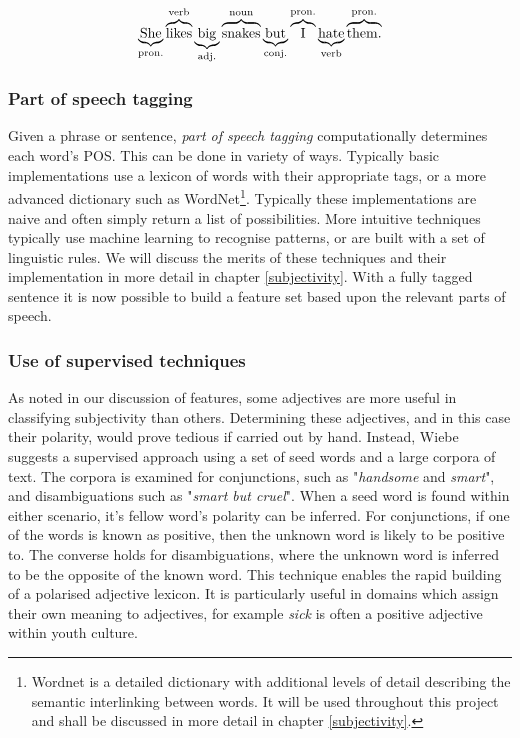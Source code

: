 \begin{equation}
	\underbrace{{\rm She}}_{\rm pron.} \overbrace{{\rm likes}}^{\rm verb} \underbrace{{\rm big}}_{\rm adj.} \overbrace{{\rm snakes}}^{\rm noun} \underbrace{{\rm but}}_{\rm conj.} \overbrace{{\rm I}}^{\rm pron.} \underbrace{{\rm hate}}_{\rm verb} \overbrace{{\rm them.}}^{\rm pron.}
\end{equation}

\subsubsection{Part of speech tagging}

Given a phrase or sentence, \emph{part of speech tagging} computationally determines each word's POS. This can be done in variety of ways. Typically basic implementations use a lexicon of words with their appropriate tags, or a more advanced dictionary such as WordNet\footnote{Wordnet is a detailed dictionary with additional levels of detail describing the semantic interlinking between words. It will be used throughout this project and shall be discussed in more detail in chapter \ref{subjectivity}.}. Typically these implementations are naive and often simply return a list of possibilities. More intuitive techniques typically use machine learning to recognise patterns, or are built with a set of linguistic rules. We will discuss the merits of these techniques and their implementation in more detail in chapter \ref{subjectivity}. With a fully tagged sentence it is now possible to build a feature set based upon the relevant parts of speech.

\subsubsection{Use of supervised techniques}

As noted in our discussion of features, some adjectives are more useful in classifying subjectivity than others. Determining these adjectives, and in this case their polarity, would prove tedious if carried out by hand. Instead, Wiebe \cite{Wiebe:2000ub} suggests a supervised approach using a set of seed words and a large corpora of text. The corpora is examined for conjunctions, such as "\emph{handsome} and \emph{smart}", and disambiguations such as "\emph{smart but cruel}". When a seed word is found within either scenario, it's fellow word's polarity can be inferred. For conjunctions, if one of the words is known as positive, then the unknown word is likely to be positive to. The converse holds for disambiguations, where the unknown word is inferred to be the opposite of the known word. This technique enables the rapid building of a polarised adjective lexicon. It is particularly useful in domains which assign their own meaning to adjectives, for example \emph{sick} is often a positive adjective within youth culture.


